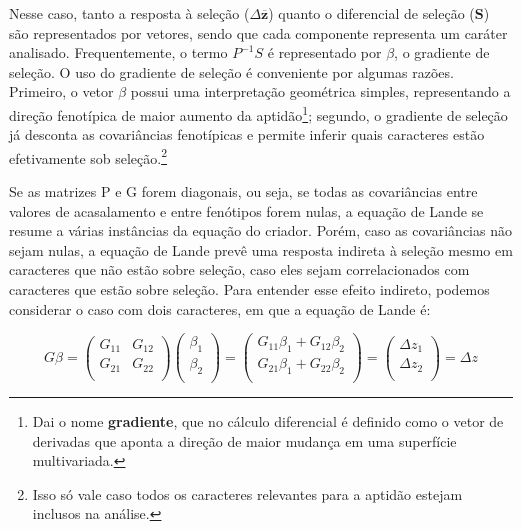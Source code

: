 \begin{refsection}
Nesse caso, tanto a resposta à seleção ($\Delta \mathbf{\overline z}$) quanto
o diferencial de seleção ($\mathbf{S}$) são representados por vetores, sendo
que cada componente representa um caráter analisado. Frequentemente, o termo
$P^{-1}S$ é representado por $\beta$, o gradiente de seleção. O uso do
gradiente de seleção é conveniente por algumas razões. Primeiro, o vetor
$\beta$ possui uma interpretação geométrica simples, representando a direção
fenotípica de maior aumento da aptidão\footnote{Dai o nome \textbf{gradiente},
que no cálculo diferencial é definido como o vetor de derivadas que aponta a
direção de maior mudança em uma superfície multivariada.}; segundo, o
gradiente de seleção já desconta as covariâncias fenotípicas e permite inferir
quais caracteres estão efetivamente sob seleção.\footnote{Isso só vale caso
todos os caracteres relevantes para a aptidão estejam inclusos na análise.}

Se as matrizes P e G forem diagonais, ou seja, se todas as covariâncias entre
valores de acasalamento e entre fenótipos forem nulas, a equação de Lande se
resume a várias instâncias da equação do criador. Porém, caso as covariâncias
não sejam nulas, a equação de Lande prevê uma resposta indireta à seleção
mesmo em caracteres que não estão sobre seleção, caso eles sejam
correlacionados com caracteres que estão sobre seleção. Para entender esse
efeito indireto, podemos considerar o caso com dois caracteres, em que a
equação de Lande é:

\begin{equation}
G\beta  =
\left (
\begin{matrix}
G_{11} & G_{12} \\
G_{21} & G_{22} \\
\end{matrix}
\right )
\left (
\begin{matrix}
\beta_{1}  \\
\beta_{2}   \\
\end{matrix}
\right )
=
\left (
\begin{matrix}
G_{11}\beta_{1} +  G_{12}\beta_{2} \\
G_{21}\beta_{1} +  G_{22}\beta_{2} \\
\end{matrix}
\right )
=
\left (
\begin{matrix}
\Delta z_{1}  \\
\Delta z_{2}   \\
\end{matrix}
\right )
=
\Delta z
\end{equation}


\end{refsection}
